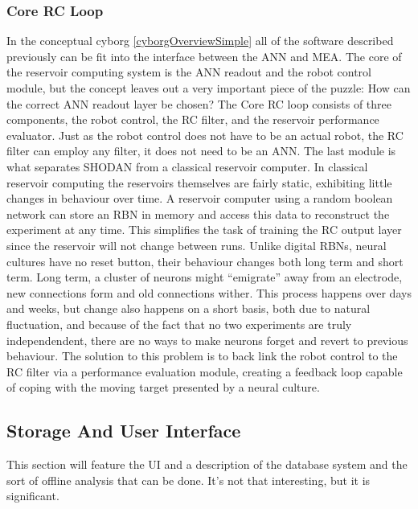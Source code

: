 \subsubsection{Core RC Loop}
In the conceptual cyborg \ref{cyborgOverviewSimple} all of the software
described previously can be fit into the interface between the ANN and MEA.
The core of the reservoir computing system is the ANN readout and the robot
control module, but the concept leaves out a very important piece of the puzzle:
How can the correct ANN readout layer be chosen?
The Core RC loop consists of three components, the robot control, the RC
filter, and the reservoir performance evaluator.
Just as the robot control does not have to be an actual robot, the RC filter
can employ any filter, it does not need to be an ANN.
The last module is what separates SHODAN from a classical reservoir computer.
In classical reservoir computing the reservoirs themselves are fairly static,
exhibiting little changes in behaviour over time.
A reservoir computer using a random boolean network can store an RBN in memory
and access this data to reconstruct the experiment at any time.
This simplifies the task of training the RC output layer since the reservoir
will not change between runs.
Unlike digital RBNs, neural cultures have no reset button, their behaviour
changes both long term and short term.
Long term, a cluster of neurons might ``emigrate'' away from an electrode, new
connections form and old connections wither.
This process happens over days and weeks, but change also happens on a short
basis, both due to natural fluctuation, and because of the fact that no two
experiments are truly independendent, there are no ways to make neurons forget
and revert to previous behaviour.
The solution to this problem is to back link the robot control to the RC filter
via a performance evaluation module, creating a feedback loop capable of coping
with the moving target presented by a neural culture.\par
\subsection{Storage And User Interface}
This section will feature the UI and a description of the database system and
the sort of offline analysis that can be done.
It's not that interesting, but it is significant.
%
